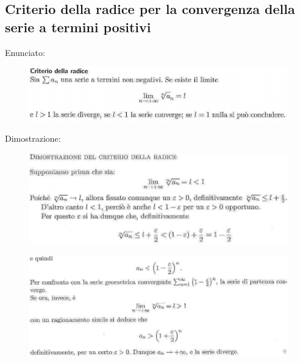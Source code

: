 \documentclass[a4paper, 9pt]{report}
\begin{document}
\subsection*{Criterio della radice per la convergenza della serie a termini positivi}
Enunciato:\begin{figure}[h!]
    \includegraphics[width=\linewidth]{../dim/radice1.PNG}
\end{figure}
\newline
Dimostrazione:\begin{figure}[h!]
    \includegraphics[width=\linewidth]{../dim/radice2.PNG}
\end{figure}
\newline
\begin{figure}[h!]
    \includegraphics[width=\linewidth]{../dim/radice3.PNG}
\end{figure}
\newpage
\end{document}
